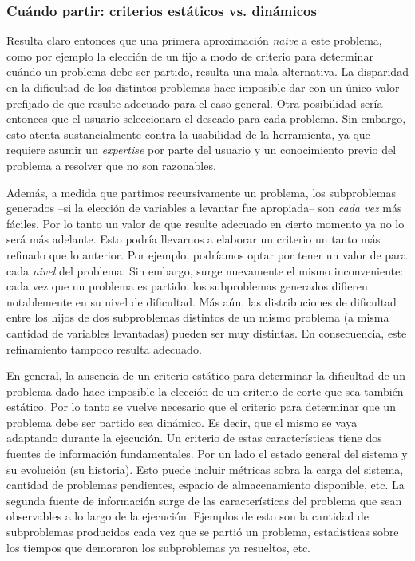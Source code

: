 \subsubsection{Cuándo partir: criterios estáticos vs. dinámicos}

Resulta claro entonces que una primera aproximación \emph{naive} a este
problema, como por ejemplo la elección de un \tout fijo a modo de criterio para
determinar cuándo un problema debe ser partido, resulta una mala alternativa.
La disparidad en la dificultad de los distintos problemas hace imposible
dar con un único valor prefijado de \tout que resulte adecuado para el
caso general. Otra posibilidad sería entonces que el usuario seleccionara
el \tout deseado para cada problema. Sin embargo, esto atenta sustancialmente
contra la usabilidad de la herramienta, ya que requiere asumir un \emph{expertise} por
parte del usuario y un conocimiento previo del problema a resolver que no son
razonables.

Además, a medida que partimos recursivamente un problema, los subproblemas
generados --si la elección de variables a levantar fue apropiada-- son
\emph{cada vez} más fáciles. Por lo tanto un valor de \tout que resulte
adecuado en cierto momento ya no lo será más adelante. Esto podría llevarnos a
elaborar un criterio un tanto más refinado que lo anterior. Por ejemplo,
podríamos optar por tener un valor de \tout para cada \emph{nivel} del
problema. Sin embargo, surge nuevamente el mismo inconveniente: cada vez
que un problema es partido, los subproblemas generados difieren notablemente
en su nivel de dificultad. Más aún, las distribuciones de dificultad entre
los hijos de dos subproblemas distintos de un mismo problema (a misma cantidad
de variables levantadas) pueden ser muy distintas. En consecuencia, este
refinamiento tampoco resulta adecuado.

En general, la ausencia de un criterio estático para determinar la dificultad
de un problema dado hace imposible la elección de un criterio de corte que
sea también estático. Por lo tanto se vuelve necesario que el criterio para
determinar que un problema debe ser partido sea dinámico. Es decir, que el
mismo se vaya adaptando durante la ejecución. Un criterio de estas
características tiene dos fuentes de información fundamentales. Por un lado el
estado general del sistema y su evolución (su historia). Esto puede incluir
métricas sobra la carga del sistema, cantidad de problemas pendientes, espacio
de almacenamiento disponible, etc. La segunda fuente de información surge de
las características del problema que sean observables a lo largo de la
ejecución. Ejemplos de esto son la cantidad de subproblemas producidos cada
vez que se partió un problema, estadísticas sobre los tiempos que demoraron
los subproblemas ya resueltos, etc. 


